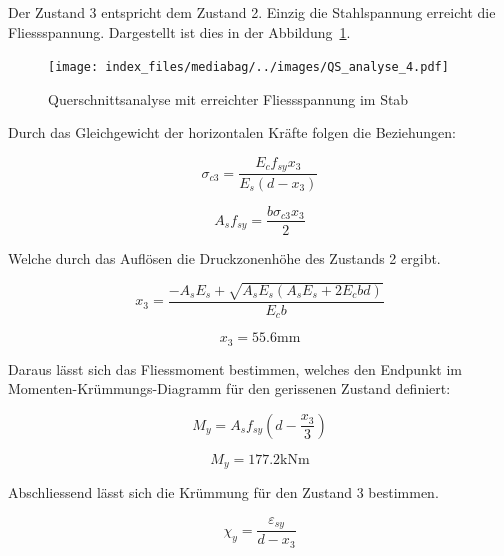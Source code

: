 \documentclass[
  12pt,
  letterpaper,
  egregdoesnotlikesansseriftitles]{scrreprt}
\begin{document}
Der Zustand 3 entspricht dem Zustand 2. Einzig die Stahlspannung
erreicht die Fliessspannung. Dargestellt ist dies in der
Abbildung~\ref{fig-qs4}.

\begin{figure}[H]

{\centering \texttt{[image: index\_files/mediabag/../images/QS\_analyse\_4.pdf]}

}

\caption{\label{fig-qs4}Querschnittsanalyse mit erreichter
Fliessspannung im Stab}

\end{figure}

Durch das Gleichgewicht der horizontalen Kräfte folgen die Beziehungen:

\begin{equation}\sigma_{c 3} = \frac{E_{c} f_{sy} x_{3}}{E_{s} \left(d - x_{3}\right)}\end{equation}

\begin{equation}A_{s} f_{sy} = \frac{b \sigma_{c 3} x_{3}}{2}\end{equation}

Welche durch das Auflösen die Druckzonenhöhe des Zustands 2 ergibt.

\begin{equation}x_{3} = \frac{- A_{s} E_{s} + \sqrt{A_{s} E_{s} \left(A_{s} E_{s} + 2 E_{c} b d\right)}}{E_{c} b}\end{equation}

\begin{equation}x_{3} = 55.6 \text{mm}\end{equation}

Daraus lässt sich das Fliessmoment bestimmen, welches den Endpunkt im
Momenten-Krümmungs-Diagramm für den gerissenen Zustand definiert:

\begin{equation}M_{y} = A_{s} f_{sy} \left(d - \frac{x_{3}}{3}\right)\end{equation}

\begin{equation}M_{y} = 177.2 \text{kN} \text{m}\end{equation}

Abschliessend lässt sich die Krümmung für den Zustand 3 bestimmen.

\begin{equation}\chi_{y} = \frac{\varepsilon_{sy}}{d - x_{3}}\end{equation}
\end{document}
